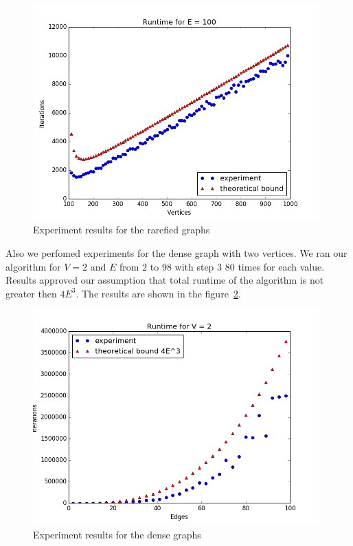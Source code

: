 \documentclass[a4paper,10pt]{article}
\theoremstyle{definition}
\begin{document}
\begin{figure}[ht]
 \begin{center}
  \includegraphics[width = 11cm]{pic/exper_rar.png}
  \caption{Experiment results for the rarefied graphs}
  \label{exper_rar} 
 \end{center} 
\end{figure}

Also we perfomed experiments for the dense graph with two vertices. We ran our algorithm for $V = 2$ and $E$ from $2$ to $98$ with step $3$ $80$ times for each value. Results approved our assumption that total runtime of the algorithm is not greater then $4E^3$. The results are shown in the figure~\ref{exper_den}.

\begin{figure}[ht]
 \begin{center}
  \includegraphics[width = 11cm]{pic/exper_den.png}
  \caption{Experiment results for the dense graphs}
  \label{exper_den} 
 \end{center} 
\end{figure}
\end{document}
